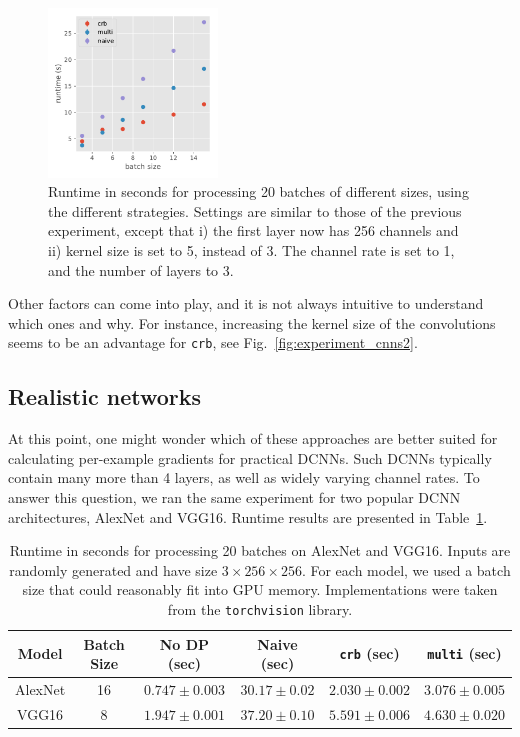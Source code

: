 \documentclass[11pt]{article}
\begin{document}
\begin{figure}[ht]
    \centering
    \includegraphics[width=0.4\textwidth]{img/exp2}
    \caption{Runtime in seconds for processing 20 batches of different sizes,
    using the different strategies. Settings are similar to those of the
    previous experiment, except that i) the first layer now has 256 channels
    and ii) kernel size is set to 5, instead of 3. The channel rate is set to
    1, and the number of layers to 3.}
    \label{fig:experiment_bs}
\end{figure}

Other factors can come into play, and it is not always intuitive to understand
which ones and why. For instance, increasing the kernel size of the convolutions
seems to be an advantage for \texttt{crb}, see Fig.~\ref{fig:experiment_cnns2}.

\subsection{Realistic networks}

At this point, one might wonder which of these approaches are better suited for
calculating per-example gradients for practical DCNNs. 
Such DCNNs typically contain many more than 4 layers, as well as widely varying
channel rates. To answer this question, we ran the same experiment for two
popular DCNN architectures, AlexNet
and VGG16. Runtime results are presented in Table~\ref{fig:experiments_compar}.

\begin{table}[ht]
    \begin{center}
        \begin{tabular}{cccccc} \toprule
            {Model} & {Batch Size} & {No DP (sec)} & {Naive (sec)} & {\texttt{crb} (sec)} & {\texttt{multi} (sec)} \\ \midrule
        {AlexNet} & 16 & $0.747 \pm 0.003$ & $30.17 \pm 0.02$ & $2.030 \pm 0.002$ & $3.076 \pm 0.005$ \\
        {VGG16} & 8 & $1.947 \pm 0.001$ & $37.20 \pm 0.10$ & $5.591 \pm 0.006$ & $4.630 \pm 0.020$ \\
            \bottomrule
        \end{tabular}
    \end{center}
    \caption{Runtime in seconds for processing 20 batches on AlexNet and VGG16.
    Inputs are randomly generated and have size $3 \times 256 \times 256$.
    For each model, we used a batch size that could reasonably fit into GPU
    memory. Implementations were taken from the \texttt{torchvision} library.}
    \label{fig:experiments_compar}
\end{table}
\end{document}
